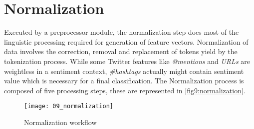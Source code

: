 \section{Normalization}
 \label{sec:normalization}

Executed by a preprocessor module, the normalization step does most of the linguistic processing required for generation of feature vectors. Normalization of data involves the correction, removal and replacement of tokens yield by the tokenization process.  While some Twitter features like \textit{@mentions} and \textit{URLs} are weightless in a sentiment context, \textit{\#hashtags} actually might contain sentiment value which is necessary for a final classification. The Normalization process is composed of five processing steps, these are represented in \autoref{fig9:normalization}. 

\begin{figure}[H]
    \centering
    \texttt{[image: 09\_normalization]}
    \caption{Normalization workflow}
    \label{fig9:normalization}
\end{figure}

